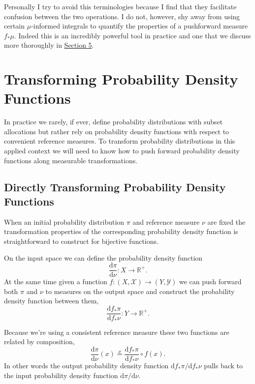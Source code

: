 \documentclass[
  letterpaper,
  DIV=11,
  numbers=noendperiod]{scrartcl}
\begin{document}
Personally I try to avoid this terminologies because I find that they
facilitate confusion between the two operations. I do not, however, shy
away from using certain \(\mu\)-informed integrals to quantify the
properties of a pushforward measure \(f_{*} \mu\). Indeed this is an
incredibly powerful tool in practice and one that we discuss more
thoroughly in \href{@sec:1d-pushforward-characterizations}{Section 5}.

\hypertarget{transforming-probability-density-functions}{%
\section{Transforming Probability Density
Functions}\label{transforming-probability-density-functions}}

In practice we rarely, if ever, define probability distributions with
subset allocations but rather rely on probability density functions with
respect to convenient reference measures. To transform probability
distributions in this applied context we will need to know how to push
forward probability density functions along measurable transformations.

\hypertarget{directly-transforming-probability-density-functions}{%
\subsection{Directly Transforming Probability Density
Functions}\label{directly-transforming-probability-density-functions}}

When an initial probability distribution \(\pi\) and reference measure
\(\nu\) are fixed the transformation properties of the corresponding
probability density function is straightforward to construct for
bijective functions.

On the input space we can define the probability density function \[
\frac{ \mathrm{d} \pi }{ \mathrm{d} \nu} : X \rightarrow \mathbb{R}^{+}.
\] At the same time given a function
\(f : (X, \mathcal{X}) \rightarrow (Y, \mathcal{Y})\) we can push
forward both \(\pi\) and \(\nu\) to measures on the output space and
construct the probability density function between them, \[
\frac{ \mathrm{d} f_{*} \pi }{ \mathrm{d} f_{*} \nu} :
Y \rightarrow \mathbb{R}^{+}.
\]

Because we're using a consistent reference measure these two functions
are related by composition, \[
\frac{ \mathrm{d} \pi }{ \mathrm{d} \nu}(x)
\overset{\nu}{=}
\frac{ \mathrm{d} f_{*} \pi }{ \mathrm{d} f_{*} \nu} \circ f(x).
\] In other words the output probability density function
\(\mathrm{d} f_{*} \pi / \mathrm{d} f_{*} \nu\) pulls back to the input
probability density function \(\mathrm{d} \pi / \mathrm{d} \nu\).
\end{document}
